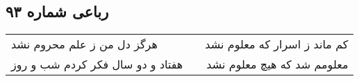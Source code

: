 \begin{center}
\section*{رباعی شماره ۹۳}
\label{sec:sh093}
\begin{longtable}{l p{0.5cm} r}
هرگز دل من ز علم محروم نشد
&&
کم ماند ز اسرار که معلوم نشد
\\
هفتاد و دو سال فکر کردم شب و روز
&&
معلومم شد که هیچ معلوم نشد
\\
\end{longtable}
\end{center}
